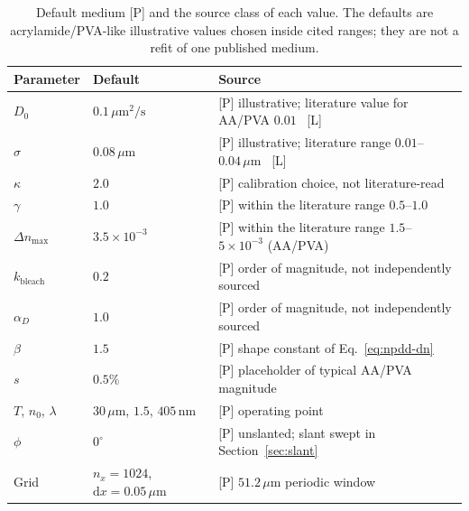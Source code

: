 \documentclass{optica-article}
\begin{document}
\begin{table}[htbp]
\centering
\caption{Default medium [P] and the source class of each value. The defaults
are acrylamide/PVA-like illustrative values chosen inside cited ranges;
they are not a refit of one published medium.}
\label{tab:mediumparams}
\begin{tabularx}{\linewidth}{l l X}
\hline
Parameter & Default & Source \\
\hline
$D_0$ & $0.1\,\mu\mathrm{m}^2/\mathrm{s}$ & [P] illustrative; literature value for AA/PVA $0.01$~\cite{sheridan2012reply} [L] \\
$\sigma$ & $0.08\,\mu\mathrm{m}$ & [P] illustrative; literature range $0.01$--$0.04\,\mu\mathrm{m}$~\cite{gleeson2008chain} [L] \\
$\kappa$ & $2.0$ & [P] calibration choice, not literature-read \\
$\gamma$ & $1.0$ & [P] within the literature range $0.5$--$1.0$~\cite{sheridan2000nonlocal} \\
$\Delta n_{\max}$ & $3.5\times10^{-3}$ & [P] within the literature range $1.5$--$5\times10^{-3}$ (AA/PVA) \\
$k_{\text{bleach}}$ & $0.2$ & [P] order of magnitude, not independently sourced \\
$\alpha_D$ & $1.0$ & [P] order of magnitude, not independently sourced \\
$\beta$ & $1.5$ & [P] shape constant of Eq.~\eqref{eq:npdd-dn} \\
$s$ & $0.5\%$ & [P] placeholder of typical AA/PVA magnitude \\
$T$, $n_0$, $\lambda$ & $30\,\mu$m, $1.5$, $405$\,nm & [P] operating point \\
$\phi$ & $0^\circ$ & [P] unslanted; slant swept in Section~\ref{sec:slant} \\
Grid & $n_x=1024$, $\mathrm{d}x=0.05\,\mu$m & [P] $51.2\,\mu$m periodic window \\
\hline
\end{tabularx}
\end{table}

\end{document}
